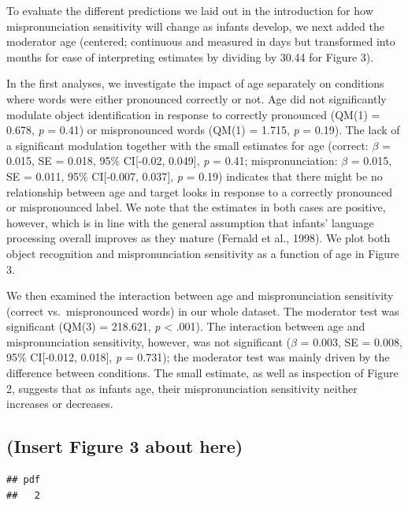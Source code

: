\documentclass[man]{apa6}
\theoremstyle{definition}
\theoremstyle{definition}
\theoremstyle{definition}
\theoremstyle{remark}
\begin{document}
To evaluate the different predictions we laid out in the introduction
for how mispronunciation sensitivity will change as infants develop, we
next added the moderator age (centered; continuous and measured in days
but transformed into months for ease of interpreting estimates by
dividing by 30.44 for Figure 3).

In the first analyses, we investigate the impact of age separately on
conditions where words were either pronounced correctly or not. Age did
not significantly modulate object identification in response to
correctly pronounced (QM(1) = 0.678, \emph{p} = 0.41) or mispronounced
words (QM(1) = 1.715, \emph{p} = 0.19). The lack of a significant
modulation together with the small estimates for age (correct: \(\beta\)
= 0.015, SE = 0.018, 95\% CI{[}-0.02, 0.049{]}, \emph{p} = 0.41;
mispronunciation: \(\beta\) = 0.015, SE = 0.011, 95\% CI{[}-0.007,
0.037{]}, \emph{p} = 0.19) indicates that there might be no relationship
between age and target looks in response to a correctly pronounced or
mispronounced label. We note that the estimates in both cases are
positive, however, which is in line with the general assumption that
infants' language processing overall improves as they mature (Fernald et
al., 1998). We plot both object recognition and mispronunciation
sensitivity as a function of age in Figure 3.

We then examined the interaction between age and mispronunciation
sensitivity (correct vs.~mispronounced words) in our whole dataset. The
moderator test was significant (QM(3) = 218.621, \emph{p} \textless{}
.001). The interaction between age and mispronunciation sensitivity,
however, was not significant (\(\beta\) = 0.003, SE = 0.008, 95\%
CI{[}-0.012, 0.018{]}, \emph{p} = 0.731); the moderator test was mainly
driven by the difference between conditions. The small estimate, as well
as inspection of Figure 2, suggests that as infants age, their
mispronunciation sensitivity neither increases or decreases.

\subsection{(Insert Figure 3 about
here)}\label{insert-figure-3-about-here}

\begin{verbatim}
## pdf 
##   2
\end{verbatim}
\end{document}
